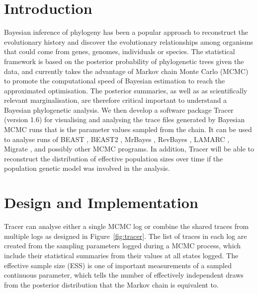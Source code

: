 \documentclass{bioinfo}
\begin{document}
\section*{Introduction}

Bayesian inference of phylogeny \citep{huelsenbeck2001bayesian, felsenstein2004inferring,yang2006computational} has been a popular approach to reconstruct the evolutionary history and discover the evolutionary relationships among organisms that could come from genes, genomes, individuals or species.
The statistical framework is based on the posterior probability of phylogenetic trees given the data, and currently takes the advantage of Markov chain Monte Carlo (MCMC) to promote the computational speed of Bayesian estimation to reach the approximated optimisation.
The posterior summaries, as well as as scientifically relevant marginalisation, %
are therefore critical important to understand a Bayesian phylogenetic analysis.
We then develop a software package Tracer (version 1.6) for visualising and analysing the trace files generated by Bayesian MCMC runs that is the parameter values sampled from the chain. 
It can be used to analyse runs of BEAST \citep{drummond2007beast,drummond2012bayesian}, BEAST2 \citep{bouckaert2014beast2}, MrBayes \citep{ronquist2012mrbayes}, RevBayes \citep{hohna2016revbayes}, LAMARC \citep{kuhner2006lamarc}, Migrate \citep{beerli2006comparison},  and possibly other MCMC programs.
In addition, Tracer will be able to reconstruct the distribution of effective population sizes over time if the population genetic model was involved in the analysis.



\section*{Design and Implementation}

Tracer can analyse either a single MCMC log or combine the shared traces from multiple logs as designed in Figure~\ref{fig:tracer}. 
The list of traces in each log are created from the sampling parameters logged during a MCMC process, which include their statistical summaries from their values at all states logged. 
The effective sample size (ESS) is one of important measurements of a sampled continuous parameter, which tells the number of effectively independent draws from the posterior distribution that the Markov chain is equivalent to.
\end{document}
